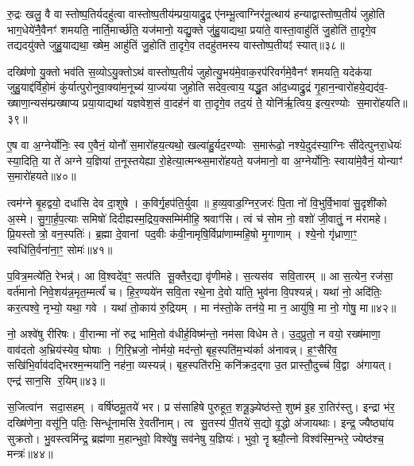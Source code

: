 रु॒द्रः खलु॒ वै वास्तोष्प॒तिर्यदहु॑त्वा वास्तोष्प॒तीय॑म्प्रया॒याद्रु॒द्र ए॑नम्भू॒त्वाग्निर॑नू॒त्थाय॑ हन्याद्वास्तोष्प॒तीयं॑ जुहोति भाग॒धेये॑नै॒वैनꣳ॑ शमयति॒ नार्ति॒मार्च्छ॑ति॒ यज॑मानो॒ यद्यु॒क्ते जु॑हु॒याद्यथा॒ प्रया॑ते॒ वास्ता॒वाहु॑तिं जु॒होति॑ ता॒दृगे॒व तद्यदयु॑क्ते जुहु॒याद्यथा॒ ख्षेम॒ आहु॑तिं जु॒होति॑ ता॒दृगे॒व तदहु॑तमस्य वास्तोष्प॒तीयꣵ॑ स्यात्॥३८॥

दख्षि॑णो यु॒क्तो भव॑ति स॒व्योऽयु॒क्तोऽथ॑ वास्तोष्प॒तीयं॑ जुहोत्यु॒भय॑मे॒वाक॒रप॑रिवर्गमे॒वैनꣳ॑ शमयति॒ यदेक॑या जुहु॒याद्द॑र्विहो॒मं कु॑र्यात्पुरोनुवा॒क्या॑म॒नूच्य॑ या॒ज्य॑या जुहोति सदेव॒त्वाय॒ यद्धु॒त आ॑द॒ध्याद्रु॒द्रं गृ॒हान॒न्वारो॑हये॒द्यद॑व॒- ख्षाणा॒न्यस॑म्प्रख्षाप्य प्रया॒याद्यथा॑ यज्ञवेश॒सं वा॒दह॑नं वा ता॒दृगे॒व तद॒यं ते॒ योनि॑र्\mbox{}ऋ॒त्विय॒ इत्य॒रण्योः स॒मारो॑हयति॥३९॥

ए॒ष वा अ॒ग्नेर्योनिः॒ स्व ए॒वैनं॒ योनौ॑ स॒मारो॑हय॒त्यथो॒ खल्वा॑हु॒र्यद॒रण्योः स॒मारू॑ढो॒ नश्ये॒दुद॑स्या॒ग्निः सी॑देत्पुनरा॒धेयः॑ स्या॒दिति॒ या ते॑ अग्ने य॒ज्ञिया॑ त॒नूस्तयेह्या रो॒हेत्या॒त्मन्थ्स॒मारो॑हयते॒ यज॑मानो॒ वा अ॒ग्नेर्योनिः॒ स्वाया॑मे॒वैनं॒ योन्याꣳ॑ स॒मारो॑हयते॥४०॥

{\anuvakamend[{ध॒त्ते॒ऽर्वा॒चीनꣵ॑ स्याथ्स॒मारो॑हयति॒ पञ्च॑चत्वारिशच्च॥10॥}]}

त्वम॑ग्ने बृ॒हद्वयो॒ दधा॑सि देव दा॒शुषे। क॒विर्गृ॒हप॑ति॒र्युवा॥ ह॒व्य॒वाड॒ग्निर॒जरः॑ पि॒ता नो॑ वि॒भुर्वि॒भावा॑ सु॒दृशी॑को अ॒स्मे। सु॒गा॒र्\mbox{}ह॒प॒त्याः समिषो॑ दिदीह्यस्म॒द्रिय॒क्सम्मि॑मीहि॒ श्रवाꣳ॑सि। त्वं च॑ सोम नो॒ वशो॑ जी॒वातुं॒ न म॑रामहे। प्रि॒यस्तोत्रो॒ वन॒स्पतिः॑। ब्र॒ह्मा दे॒वानां पद॒वीः क॑वी॒नामृषि॒र्विप्रा॑णाम्महि॒षो मृ॒गाणाम्। श्ये॒नो गृ॑ध्राणा॒ꣳ॒ स्वधि॑ति॒र्वना॑ना॒ꣳ॒ सोमः॑॥४१॥

प॒वित्र॒मत्ये॑ति॒ रेभन्न्॑। आ वि॒श्वदे॑व॒ꣳ॒ सत्प॑ति सू॒क्तैर॒द्या वृ॑णीमहे। स॒त्यस॑व सवि॒तारम्॥ आ स॒त्येन॒ रज॑सा॒ वर्त॑मानो निवे॒शय॑न्न॒मृत॒म्मर्त्यं॑ च। हि॒र॒ण्यये॑न सवि॒ता रथे॒ना दे॒वो या॑ति॒ भुव॑ना वि॒पश्यन्न्॑। यथा॑ नो॒ अदि॑तिः॒ कर॒त्पश्वे॒ नृभ्यो॒ यथा॒ गवे। यथा॑ तो॒काय॑ रु॒द्रियम्। मा न॑स्तो॒के तन॑ये॒ मा न॒ आयु॑षि॒ मा नो॒ गोषु॒ मा॥४२॥

नो॒ अश्वे॑षु रीरिषः। वी॒रान्मा नो॑ रुद्र भामि॒तो व॑धीर्\mbox{}ह॒विष्म॑न्तो॒ नम॑सा विधेम ते। उ॒द॒प्रुतो॒ न वयो॒ रख्ष॑माणा॒ वाव॑दतो अ॒भ्रिय॑स्येव॒ घोषाः। गि॒रि॒भ्रजो॒ नोर्मयो॒ मद॑न्तो॒ बृह॒स्पति॑म॒भ्य॑र्का अ॑नावन्न्। ह॒ꣳ॒सैरि॑व॒ सखि॑भि॒र्वाव॑दद्भिरश्म॒न्मया॑नि॒ नह॑ना॒ व्यस्यन्न्॑। बृह॒स्पति॑रभि॒ कनि॑क्रद॒द्गा उ॒त प्रास्तौ॒दुच्च॑ वि॒द्वा अ॑गायत्। एन्द्र॑ सान॒सि र॒यिम्॥४३॥

स॒जित्वा॑न सदा॒सहम्। वर्\mbox{}षि॑ष्ठमू॒तये॑ भर। प्र स॑साहिषे पुरुहूत॒ शत्रू॒ञ्ज्येष्ठ॑स्ते॒ शुष्म॑ इ॒ह रा॒तिर॑स्तु। इन्द्रा भ॑र॒ दख्षि॑णेना॒ वसू॑नि॒ पतिः॒ सिन्धू॑नामसि रे॒वती॑नाम्। त्व सु॒तस्य॑ पी॒तये॑ स॒द्यो वृ॒द्धो अ॑जायथाः। इन्द्र॒ ज्यैष्ठ्या॑य सुक्रतो। भु॒वस्त्वमि॑न्द्र॒ ब्रह्म॑णा म॒हान्भुवो॒ विश्वे॑षु॒ सव॑नेषु य॒ज्ञियः॑। भुवो॒ नॄश्च्यौ॒त्नो विश्व॑स्मि॒न्भरे॒ ज्येष्ठ॑श्च॒ मन्त्रः॑॥४४॥

